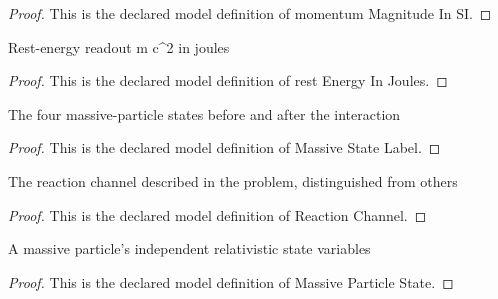 \begin{proof}
  This is the declared model definition of momentum Magnitude In SI.
\end{proof}
\begin{definition}
  \label{def:physics:phyx-mini-0613:phyxminiproblems-problemphyxmini0613-restenergyinjoules}
  Rest-energy readout m c\textasciicircum{}2 in joules
\end{definition}
\begin{proof}
  This is the declared model definition of rest Energy In Joules.
\end{proof}
\begin{definition}
  \label{def:physics:phyx-mini-0613:phyxminiproblems-problemphyxmini0613-massivestatelabel}
  The four massive-particle states before and after the interaction
\end{definition}
\begin{proof}
  This is the declared model definition of Massive State Label.
\end{proof}
\begin{definition}
  \label{def:physics:phyx-mini-0613:phyxminiproblems-problemphyxmini0613-reactionchannel}
  The reaction channel described in the problem, distinguished from others
\end{definition}
\begin{proof}
  This is the declared model definition of Reaction Channel.
\end{proof}
\begin{definition}
  \label{def:physics:phyx-mini-0613:phyxminiproblems-problemphyxmini0613-massiveparticlestate}
  A massive particle's independent relativistic state variables
\end{definition}
\begin{proof}
  This is the declared model definition of Massive Particle State.
\end{proof}
